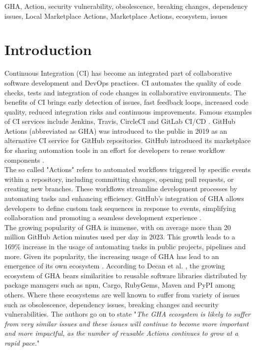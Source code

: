 \documentclass[conference]{IEEEtran}
\begin{document}
\begin{IEEEkeywords}
GHA, Action, security vulnerability, obsolescence, breaking changes, dependency issues, Local Marketplace Actions, Marketplace Actions, ecosystem, issues
\end{IEEEkeywords}

\section{Introduction}
    Continuous Integration (CI) has become an integrated part of collaborative software development and DevOps practices. CI automates the quality of code checks, tests and integration of code changes in collaborative environments. The benefits of CI brings early detection of issues, fast feedback loops, increased code quality, reduced integration risks and continuous improvements. Famous examples of CI services include Jenkins, Travis, CircleCI and GitLab CI/CD \cite{dabbish2012social}. GitHub Actions (abbreviated as GHA) was introduced to the public in 2019 as an alternative CI service for GitHub repositories. GitHub introduced its marketplace for sharing automation tools in an effort for developers to reuse workflow components \cite{saroar2023developers}. \\ 
    The so called "Actions" refers to automated workflows triggered by specific events within a repository, including committing changes, opening pull requests, or creating new branches. These workflows streamline development processes by automating tasks and enhancing efficiency. GitHub's integration of GHA allows developers to define custom task sequences in response to events, simplifying collaboration and promoting a seamless development experience \cite{chandrasekara2021getting}. \\
    The growing popularity of GHA is immense, with on average more than 20 million GitHub Action minutes used per day in 2023. This growth leads to a 169\% increase in the usage of automating tasks in public projects,  pipelines and more\cite{github2023octoverse}. Given its popularity,  the increasing usage of GHA has lead to an emergence of its own ecosystem \cite{decan2022use}.  According to Decan et al. \cite{decan2022use}, the growing ecosystem of GHA bears similarities to reusable software libraries distributed by package managers such as npm, Cargo, RubyGems, Maven and PyPI among others. Where these ecosystems are well known to suffer from variety of issues such as obsolescence, dependency issues, breaking changes and security vulnerabilities\cite{decan2022use}. The authors go on to state "\textit{The GHA ecosystem is likely to suffer from very similar issues and these issues will continue to become more important and more impactful, as the number of reusable Actions continues to grow at a rapid pace.}"\\
\end{document}
